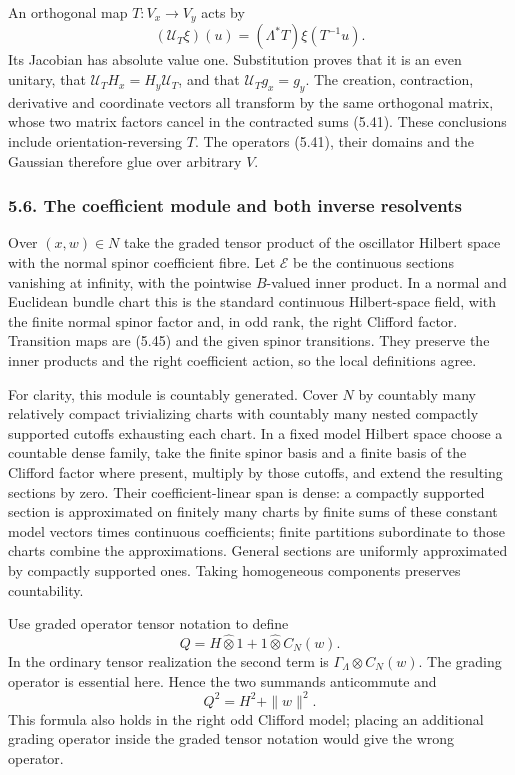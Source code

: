 \documentclass[
  11pt,
]{article}
\begin{document}
An orthogonal map \(T:V_x\to V_y\) acts by \[
(\mathcal U_T\xi)(u)=(\Lambda^*T)\xi(T^{-1}u).
\tag{5.45}
\] Its Jacobian has absolute value one. Substitution proves that it is
an even unitary, that \(\mathcal U_TH_x=H_y\mathcal U_T\), and that
\(\mathcal U_Tg_x=g_y\). The creation, contraction, derivative and
coordinate vectors all transform by the same orthogonal matrix, whose
two matrix factors cancel in the contracted sums (5.41). These
conclusions include orientation-reversing \(T\). The operators (5.41),
their domains and the Gaussian therefore glue over arbitrary \(V\).

\subsubsection{5.6. The coefficient module and both inverse
resolvents}\label{the-coefficient-module-and-both-inverse-resolvents}

Over \((x,w)\in N\) take the graded tensor product of the oscillator
Hilbert space with the normal spinor coefficient fibre. Let
\(\mathcal E\) be the continuous sections vanishing at infinity, with
the pointwise \(B\)-valued inner product. In a normal and Euclidean
bundle chart this is the standard continuous Hilbert-space field, with
the finite normal spinor factor and, in odd rank, the right Clifford
factor. Transition maps are (5.45) and the given spinor transitions.
They preserve the inner products and the right coefficient action, so
the local definitions agree.

For clarity, this module is countably generated. Cover \(N\) by
countably many relatively compact trivializing charts with countably
many nested compactly supported cutoffs exhausting each chart. In a
fixed model Hilbert space choose a countable dense family, take the
finite spinor basis and a finite basis of the Clifford factor where
present, multiply by those cutoffs, and extend the resulting sections by
zero. Their coefficient-linear span is dense: a compactly supported
section is approximated on finitely many charts by finite sums of these
constant model vectors times continuous coefficients; finite partitions
subordinate to those charts combine the approximations. General sections
are uniformly approximated by compactly supported ones. Taking
homogeneous components preserves countability.

Use graded operator tensor notation to define \[
Q=H\widehat\otimes1+1\widehat\otimes C_N(w).
\tag{5.46}
\] In the ordinary tensor realization the second term is
\(\Gamma_\Lambda\otimes C_N(w)\). The grading operator is essential
here. Hence the two summands anticommute and \[
Q^2=H^2+\|w\|^2.
\tag{5.47}
\] This formula also holds in the right odd Clifford model; placing an
additional grading operator inside the graded tensor notation would give
the wrong operator.
\end{document}
